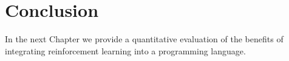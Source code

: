 \section{Conclusion}

In the next Chapter we provide a quantitative evaluation of the benefits of integrating reinforcement learning into a programming language.
